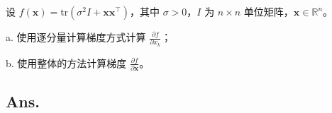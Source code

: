 \begin{example}
    设 \( f(\bm{x}) = \text{tr}(\sigma^2 I + \bm{x}\bm{x}^\top) \)，其中 \(\sigma > 0\)，\( I \) 为 \( n \times n \) 单位矩阵，\( \bm{x} \in \mathbb{R}^n \)。

    a. 使用逐分量计算梯度方式计算 \(\frac{\partial f}{\partial x_k}\)；
    
    b. 使用整体的方法计算梯度 \(\frac{\partial f}{\partial \bm{x}}\)。
    \end{example}

    \subsection*{Ans.}

    